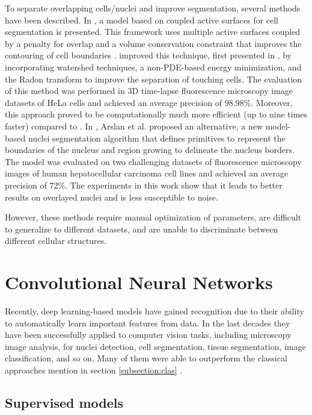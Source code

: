 To separate overlapping cells/nuclei and improve segmentation, several methods have been described. In \cite{active:couple}, a model based on coupled active surfaces for cell segmentation is presented. This framework uses multiple active surfaces coupled by a penalty for overlap and a volume conservation constraint that improves the contouring of cell boundaries \cite{couple:original}. \citet{active:couple} improved this technique, first presented in \cite{couple:original}, by incorporating watershed techniques, a \ac{non-PDE}-based energy minimization, and the Radon transform to improve the separation of touching cells. The evaluation of this method was performed in \ac{3D} time-lapse fluorescence microscopy image datasets of HeLa cells and achieved an average precision of 98.98\%. Moreover, this approach proved to be computationally much more efficient (up to nine times faster) compared to \cite{couple:original}. In \cite{graphs}, Arslan et al. proposed an alternative, a new model-based nuclei segmentation algorithm that defines primitives to represent the boundaries of the nucleus and region growing to delineate the nucleus borders. The model was evaluated on two challenging datasets of fluorescence microscopy images of human hepatocellular carcinoma cell lines and achieved an average precision of 72\%. The experiments in this work show that it leads to better results on overlayed nuclei and is less susceptible to noise.

However, these methods require manual optimization of parameters, are difficult to generalize to different datasets, and are unable to discriminate between different cellular structures. 
 
\section{Convolutional Neural Networks}

Recently, deep learning-based models have gained recognition due to their ability to automatically learn important features from data. In the last decades they have been successfully applied to computer vision tasks, including microscopy image analysis, for nuclei detection, cell segmentation, tissue segmentation, image classification, and so on. Many of them were able to outperform the classical approaches mention in section \ref{subsection:clas} \cite{review_cnn}.

\subsection{Supervised models}

